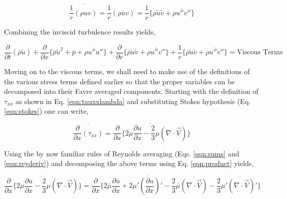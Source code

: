 \begin{displaymath}
	\overline{\frac{1}{r}(\rho uv)} = \frac{1}{r}(\overline{\rho u v}) 
	= \frac{1}{r}\Big\{\overline{\rho}\tilde{u}\tilde{v} +
	\overline{\rho u'' v''}\Big\}
\end{displaymath}

	Combining the inviscid turbulence results yields,

\begin{equation}
	\frac{\partial}{\partial t}(\overline{\rho}\tilde{u}) + \frac{\partial}{\partial x}\Big\{
	\overline{\rho}\tilde{u}^2 + \overline{p} + \overline{\rho u'' u''}\Big\} + \frac{\partial}{\partial r}\Big\{
	\overline{\rho}\tilde{u}\tilde{v} + \overline{\rho u'' v''}\Big\} + \frac{1}{r}\Big\{
	\overline{\rho}\tilde{u}\tilde{v} + \overline{\rho u'' v''}\Big\} = \textrm{Viscous Terms}
\label{eqn:xmomturbinv}
\end{equation}

	Moving on to the viscous terms, we shall need to make use of the definitions of the various stress terms
defined earlier so that the proper variables can be decomposed into their Favre averaged components.  
Starting with the definition of $\tau _{xx}$ as shown in Eq. \ref{eqn:tauxxlambda}  
and substituting Stokes hypothesis (Eq. \ref{eqn:stokes}) one can write,

\begin{displaymath}
	\overline{\frac{\partial}{\partial x}(\tau_{xx})} = \overline{\frac{\partial}{\partial x}\Big\{
	2\mu \frac{\partial u}{\partial x} - \frac{2}{3}\mu (\nabla \cdot \vec{V})} \Big\}
\end{displaymath}

	Using the by now familiar rules of Reynolds averaging (Eqs. \ref{eqn:sums} and \ref{eqn:reyderiv}) and
decomposing the above terms using Eq. \ref{eqn:product} yields,

\begin{displaymath}
	\overline{\frac{\partial}{\partial x}\Big\{
	2\mu \frac{\partial u}{\partial x} - \frac{2}{3}\mu (\nabla \cdot \vec{V})} \Big\} = \frac{\partial}{\partial x}\Big\{
	2 \overline{\mu} \frac{\partial \overline{u}}{\partial x} + 2\overline{\mu' (\frac{\partial u}{\partial x})'}
	- \frac{2}{3}\overline{\mu} \overline{(\nabla \cdot \vec{V})} - \frac{2}{3}\overline{\mu'(\nabla \cdot \vec{V})'}\Big\}
\end{displaymath}

